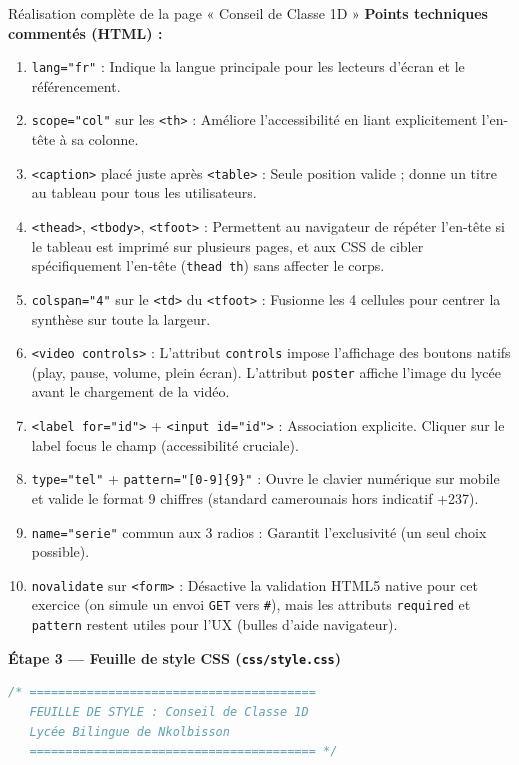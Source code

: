 \documentclass[11pt]{article}
\begin{document}
\begin{exoresolu}{Réalisation complète de la page « Conseil de Classe 1D »}
\textbf{Points techniques commentés (HTML) :}
\begin{enumerate}
    \item \texttt{lang="fr"} : Indique la langue principale pour les lecteurs d'écran et le référencement.
    \item \texttt{scope="col"} sur les \texttt{<th>} : Améliore l'accessibilité en liant explicitement l'en-tête à sa colonne.
    \item \texttt{<caption>} placé juste après \texttt{<table>} : Seule position valide ; donne un titre au tableau pour tous les utilisateurs.
    \item \texttt{<thead>}, \texttt{<tbody>}, \texttt{<tfoot>} : Permettent au navigateur de répéter l'en-tête si le tableau est imprimé sur plusieurs pages, et aux CSS de cibler spécifiquement l'en-tête (\texttt{thead th}) sans affecter le corps.
    \item \texttt{colspan="4"} sur le \texttt{<td>} du \texttt{<tfoot>} : Fusionne les 4 cellules pour centrer la synthèse sur toute la largeur.
    \item \texttt{<video controls>} : L'attribut \texttt{controls} impose l'affichage des boutons natifs (play, pause, volume, plein écran). L'attribut \texttt{poster} affiche l'image du lycée avant le chargement de la vidéo.
    \item \texttt{<label for="id">} + \texttt{<input id="id">} : Association explicite. Cliquer sur le label focus le champ (accessibilité cruciale).
    \item \texttt{type="tel"} + \texttt{pattern="[0-9]\{9\}"} : Ouvre le clavier numérique sur mobile et valide le format 9 chiffres (standard camerounais hors indicatif +237).
    \item \texttt{name="serie"} commun aux 3 radios : Garantit l'exclusivité (un seul choix possible).
    \item \texttt{novalidate} sur \texttt{<form>} : Désactive la validation HTML5 native pour cet exercice (on simule un envoi \texttt{GET} vers \texttt{\#}), mais les attributs \texttt{required} et \texttt{pattern} restent utiles pour l'UX (bulles d'aide navigateur).
\end{enumerate}

\textbf{Étape 3 — Feuille de style CSS (\texttt{css/style.css})}
\begin{lstlisting}[language=CSS]
/* ========================================
   FEUILLE DE STYLE : Conseil de Classe 1D
   Lycée Bilingue de Nkolbisson
   ======================================== */


\end{lstlisting}
\end{exoresolu}
\end{document}
